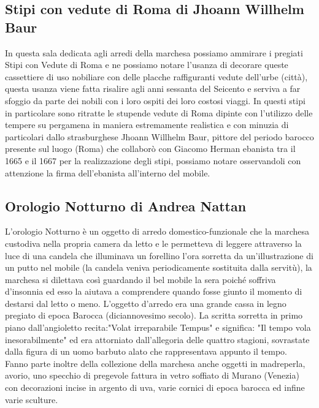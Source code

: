 \documentclass[hidelinks,12pt,a4paper]{article}
\begin{document}
\begin{flushleft}
			\subsection{Stipi con vedute di Roma di Jhoann Willhelm Baur}
			In questa sala dedicata agli arredi della marchesa possiamo ammirare i pregiati Stipi con Vedute di Roma e ne possiamo notare l'usanza di decorare queste cassettiere di uso nobiliare con delle placche raffiguranti vedute dell'urbe (città), questa usanza viene fatta risalire agli anni sessanta del Seicento e serviva a far sfoggio da parte dei nobili con i loro ospiti dei loro costosi viaggi. In questi stipi in particolare sono ritratte le stupende vedute di Roma dipinte con l'utilizzo delle tempere su pergamena in maniera estremamente realistica e con minuzia di particolari dallo strasburghese Jhoann Willhelm Baur, pittore del periodo barocco presente sul luogo (Roma) che collaborò con Giacomo Herman ebanista tra il 1665 e il 1667 per la realizzazione degli stipi, possiamo notare osservandoli con attenzione la firma dell'ebanista all'interno del mobile.
	
			\subsection{Orologio Notturno di Andrea Nattan}
			L'orologio Notturno è un oggetto di arredo domestico-funzionale che la marchesa custodiva nella propria camera da letto e le permetteva di leggere attraverso la luce di una candela che illuminava un forellino l'ora sorretta da un'illustrazione di un putto nel mobile (la candela veniva periodicamente sostituita dalla servitù), la marchesa si dilettava così guardando il bel mobile la sera poiché soffriva d'insonnia ed esso la aiutava a comprendere quando fosse giunto il momento di destarsi dal letto o meno. L'oggetto d'arredo era una grande cassa in legno pregiato di epoca Barocca (diciannovesimo secolo). La scritta sorretta in primo piano dall'angioletto recita:"Volat irreparabile Tempus" e significa: "Il tempo vola inesorabilmente" ed era attorniato dall'allegoria delle quattro stagioni, sovrastate dalla figura di un uomo barbuto alato che rappresentava appunto il tempo.\\
			Fanno parte inoltre della collezione della marchesa anche oggetti in madreperla, avorio, uno specchio di pregevole fattura in vetro soffiato di Murano (Venezia) con decorazioni incise in argento di uva, varie cornici di epoca barocca ed infine varie sculture.
	

\end{flushleft}
\end{document}
